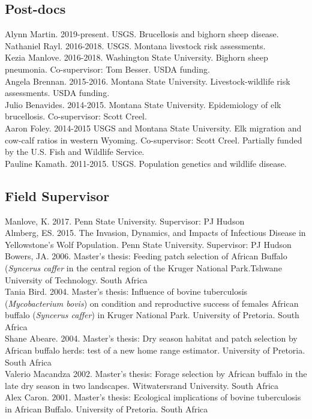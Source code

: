 \documentclass[12pt,]{article}
\begin{document}
\hypertarget{post-docs}{%
\subsection{Post-docs}\label{post-docs}}

Alynn Martin. 2019-present. USGS. Brucellosis and bighorn sheep
disease.\\
Nathaniel Rayl. 2016-2018. USGS. Montana livestock risk assessments.\\
Kezia Manlove. 2016-2018. Washington State University. Bighorn sheep
pneumonia. Co-supervisor: Tom Besser. USDA funding.\\
Angela Brennan. 2015-2016. Montana State University. Livestock-wildlife
risk assessments. USDA funding.\\
Julio Benavides. 2014-2015. Montana State University. Epidemiology of
elk brucellosis. Co-supervisor: Scott Creel.\\
Aaron Foley. 2014-2015 USGS and Montana State University. Elk migration
and cow-calf ratios in western Wyoming. Co-supervisor: Scott Creel.
Partially funded by the U.S. Fish and Wildlife Service.\\
Pauline Kamath. 2011-2015. USGS. Population genetics and wildlife
disease.

\hypertarget{field-supervisor}{%
\subsection{Field Supervisor}\label{field-supervisor}}

Manlove, K. 2017. Penn State University. Supervisor: PJ Hudson\\
Almberg, ES. 2015. The Invasion, Dynamics, and Impacts of Infectious
Disease in Yellowstone's Wolf Population. Penn State University.
Supervisor: PJ Hudson\\
Bowers, JA. 2006. Master's thesis: Feeding patch selection of African
Buffalo (\emph{Syncerus caffer} in the central region of the Kruger
National Park.Tshwane University of Technology. South Africa\\
Tania Bird. 2004. Master's thesis: Influence of bovine tuberculosis
(\emph{Mycobacterium bovis}) on condition and reproductive success of
females African buffalo (\emph{Syncerus caffer}) in Kruger National
Park. University of Pretoria. South Africa\\
Shane Abeare. 2004. Master's thesis: Dry season habitat and patch
selection by African buffalo herds: test of a new home range estimator.
University of Pretoria. South Africa\\
Valerio Macandza 2002. Master's thesis: Forage selection by African
buffalo in the late dry season in two landscapes. Witwatersrand
University. South Africa\\
Alex Caron. 2001. Master's thesis: Ecological implications of bovine
tuberculosis in African Buffalo. University of Pretoria. South Africa
\end{document}
